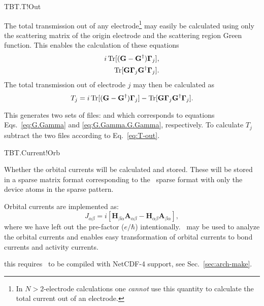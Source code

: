 \begin{fdflogicalF}{TBT.T!Out}
  
  The total transmission out of any electrode\footnote{In
      $N>2$-electrode calculations one \emph{cannot} use this quantity
      to calculate the total current out of an electrode.} may easily
  be calculated using only the scattering matrix of the origin
  electrode and the scattering region Green function.
  This enables the calculation of these equations
  \begin{align}
    i\operatorname{Tr}[(\mathbf G - \mathbf G^\dagger)\boldsymbol \Gamma_j],
    \label{eq:G.Gamma}
    \\
    \operatorname{Tr}[\mathbf G \boldsymbol \Gamma_j \mathbf G^\dagger\boldsymbol
    \Gamma_j].
    \label{eq:G.Gamma.G.Gamma}
  \end{align}
  The total transmission out of electrode $j$ may then be calculated
  as
  \begin{equation}
    \label{eq:T-out}
    T_j = i\operatorname{Tr}[(\mathbf G - \mathbf G^\dagger)\boldsymbol \Gamma_j] 
    -
    \operatorname{Tr}[\mathbf G \boldsymbol \Gamma_j \mathbf G^\dagger\boldsymbol \Gamma_j].
  \end{equation}

  This generates two sets of files:  and
   which corresponds to equations
  Eqs.~\eqref{eq:G.Gamma} and \eqref{eq:G.Gamma.G.Gamma},
  respectively. To calculate $T_j$ subtract the two files
  according to Eq.~\eqref{eq:T-out}.
  
\end{fdflogicalF}

\begin{fdflogicalF}{TBT.Current!Orb}

  Whether the orbital currents will be calculated and stored.  These
  will be stored in a sparse matrix format corresponding to the
  \siesta\ sparse format with only the device atoms in the sparse
  pattern.
  
  Orbital currents are implemented as:
  \begin{equation}
    J_{\alpha \beta} = i [
    \mathbf H_{\beta\alpha} \mathbf A_{\alpha\beta}
    - 
    \mathbf H_{\alpha\beta} \mathbf A_{\beta\alpha}],
  \end{equation}
  where we have left out the pre-factor ($e/\hbar$)
  intentionally. \sisl\ may be used to analyze the orbital currents
  and enables easy transformation of orbital currents to bond currents
  and activity currents\cite{Papior2017}.

  \note this requires \tbtrans\ to be compiled with NetCDF-4 support,
  see Sec.~\ref{sec:arch-make}.
  
\end{fdflogicalF}

